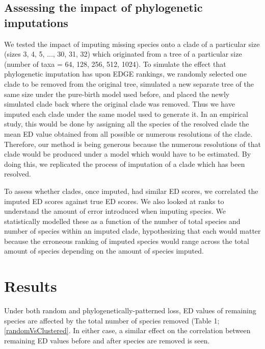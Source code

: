 \documentclass[12pt,english]{article}
\begin{document}
\subsection*{Assessing the impact of phylogenetic imputations}
We tested the impact of imputing missing species onto a clade of a particular
size (sizes 3, 4, 5, ..., 30, 31, 32) which originated from a tree of a
particular size (number of taxa = 64, 128, 256, 512, 1024). To simulate the
effect that phylogenetic imputation has upon EDGE rankings, we randomly selected
one clade to be removed from the original tree, simulated a new separate tree of
the same size under the pure-birth model used before, and placed the newly
simulated clade back where the original clade was removed. Thus we have imputed
each clade under the same model used to generate it. In an empirical study, this
would be done by assigning all the species of the resolved clade the mean ED
value obtained from all possible or numerous resolutions of the clade.
Therefore, our method is being generous because the numerous resolutions of that
clade would be produced under a model which would have to be estimated. By doing
this, we replicated the process of imputation of a clade which has been
resolved. 

To assess whether clades, once imputed, had similar ED scores, we
correlated the imputed ED scores against true ED scores. We also looked at ranks
to understand the amount of error introduced when imputing species. We
statistically modelled these as a function of the number of total species and
number of species within an imputed clade, hypothesizing that each would matter
because the erroneous ranking of imputed species would range across the total
amount of species depending on the amount of species imputed.

\section*{Results}
Under both random and phylogenetically-patterned loss, ED values of remaining
species are affected by the total number of species removed (Table 1;
\ref{randomVsClustered}. In either case, a similar effect on the correlation
between remaining ED values before and after species are removed is seen.  
\end{document}

